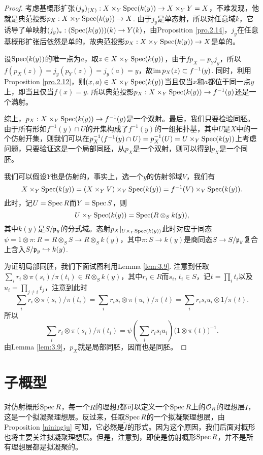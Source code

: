 \begin{proof}
考虑基概形扩张$(j_y)_{(X)}:X\times_Y \operatorname{Spec} (k(y))\to X\times_Y Y=X$，不难发现，他就是典范投影$p_X:X\times_Y \operatorname{Spec} (k(y))\to X$. 由于$j_y$是单态射，所以对任意域$k$，它诱导了单映射$(j_y)_*:(\operatorname{Spec} (k(y)))(k)\to Y(k)$，由Proposition \ref{pro.2.14}，$j_y$在任意基概形扩张后依然是单的，故典范投影$p_X:X\times_Y \operatorname{Spec} (k(y))\to X$是单的。

设$\operatorname{Spec}(k(y))$的唯一点为$a$，取$z\in X\times_Y \operatorname{Spec} (k(y))$，由于$fp_X=p_Yj_y$，所以$f(p_X(z))=j_y(p_Y(z))=j_y(a)=y$，故$\operatorname{im} p_X(z)\subset f^{-1}(y)$. 同时，利用Proposition \ref{pro.2.12}，则$(x,a)\in X\times_Y\operatorname{Spec} (k(y))$当且仅当$x$和$a$都位于同一点$y$上，即当且仅当$f(x)=y$. 所以典范投影$p_X:X\times_Y \operatorname{Spec} (k(y))\to f^{-1}(y)$还是一个满射。

综上，$p_X:X\times_Y \operatorname{Spec} (k(y))\to f^{-1}(y)$是一个双射。最后，我们只要检验同胚。由于所有形如$f^{-1}(y)\cap U$的开集构成了$f^{-1}(y)$的一组拓扑基，其中$U$是$X$中的一个仿射开集，则我们可以在$p_X^{-1}(f^{-1}(y)\cap U)=p_X^{-1}(U)=U \times_Y \operatorname{Spec} (k(y))$上考虑问题，只要验证这是一个局部同胚，从$p_X$是一个双射，则可以得到$p_X$是一个同胚。

我们可以假设$Y$也是仿射的，事实上，选一个$y$的仿射邻域$V$，我们有
\[
	X\times_Y \operatorname{Spec} (k(y))=(X\times_Y V)\times_V \operatorname{Spec} (k(y))=f^{-1}(V)\times_V \operatorname{Spec} (k(y)).
\]
此时，记$U=\operatorname{Spec} R$而$Y=\operatorname{Spec} S$，则
\[
	U \times_Y \operatorname{Spec} (k(y))=\operatorname{Spec} (R\otimes_S k(y)),
\]
其中$k(y)$是$S/\mathfrak{p}_y$的分式域。态射$p_X|_{U \times_Y \operatorname{Spec} (k(y))}$此时对应于同态$\psi=1\otimes \pi:R=R\otimes_S S\to R\otimes_S k(y)$，其中$\pi:S\to k(y)$是商同态$S\to S/\mathfrak{p}_y$复合上含入$S/\mathfrak{p}_y\hookrightarrow k(y)$.

为证明局部同胚，我们下面试图利用Lemma \ref{lem:3.9}. 注意到任取$\sum_i r_i \otimes \pi(s_i)/\pi(t_i)\in R\otimes_S k(y)$，其中$r_i\in R$而$s_i$, $t_i\in S$，记$t=\prod_i t_i$以及$u_i=\prod_{j\neq i}t_j$，注意到此时
\[
	\sum_i r_i \otimes \pi(s_i)/\pi(t_i)=\sum_i r_is_i \otimes \pi(u_i)/\pi(t)=\sum_i r_is_iu_i \otimes 1/\pi(t).
\]
所以
\[
	\sum_i r_i \otimes \pi(s_i)/\pi(t_i)=\psi\left(\sum_i r_is_iu_i\right)\bigl(1\otimes \pi(t)\bigr)^{-1}.
\]
由Lemma \ref{lem:3.9}，$p_X$就是局部同胚，因而也是同胚。
\end{proof}

\section{子概型}

对仿射概形$\operatorname{Spec} R$，每一个$R$的理想$I$都可以定义一个$\operatorname{Spec} R$上的$\mathcal{O}_R$的理想层$\widetilde{I}$，这是一个拟凝聚理想层。反过来，任取$\operatorname{Spec} R$的一个拟凝聚理想层，由Proposition \ref{niningju} 可知，它必然是$\widetilde{I}$的形式。因为这个原因，我们后面对概形也将主要关注拟凝聚理想层。但是，注意到，即使是仿射概形$\operatorname{Spec} R$，并不是所有理想层都是拟凝聚的。

